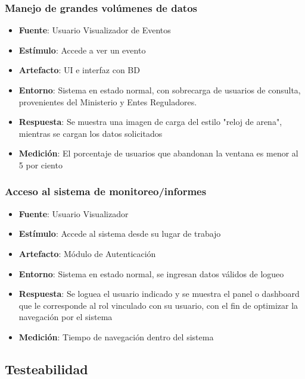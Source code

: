 \subsubsection{Manejo de grandes volúmenes de datos}
\begin{itemize}
\item {\bf Fuente}: Usuario Visualizador de Eventos
\item {\bf Estímulo}: Accede a ver un evento
\item {\bf Artefacto}: UI e interfaz con BD
\item {\bf Entorno}: Sistema en estado normal, con sobrecarga de usuarios de consulta, provenientes del Ministerio y Entes Reguladores.
\item {\bf Respuesta}: Se muestra una imagen de carga del estilo "reloj de arena", mientras se cargan los datos solicitados
\item {\bf Medición}: El porcentaje de usuarios que abandonan la ventana es menor al 5 por ciento
\end{itemize}

\subsubsection{Acceso al sistema de monitoreo/informes}
\begin{itemize}
\item {\bf Fuente}: Usuario Visualizador
\item {\bf Estímulo}: Accede al sistema desde su lugar de trabajo
\item {\bf Artefacto}: Módulo de Autenticación
\item {\bf Entorno}: Sistema en estado normal, se ingresan datos válidos de logueo
\item {\bf Respuesta}: Se loguea el usuario indicado y se muestra el panel o dashboard que le corresponde al rol vinculado con su usuario, con el fin de optimizar la navegación por el sistema 
\item {\bf Medición}: Tiempo de navegación dentro del sistema
\end{itemize}

\subsection{Testeabilidad}

